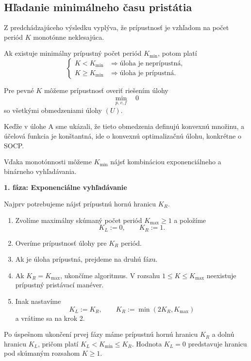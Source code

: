 \documentclass[12pt,a4paper]{article}
\begin{document}
\subsection*{Hľadanie minimálneho času pristátia}

Z predchádzajúceho výsledku vyplýva, že
prípustnosť je vzhľadom na počet periód $K$
monotónne neklesajúca.

Ak existuje minimálny prípustný počet periód
$K_{\min}$, potom platí
\[
\begin{cases}
K<K_{\min}
&\Rightarrow \text{úloha je neprípustná},\\
K\ge K_{\min}
&\Rightarrow \text{úloha je prípustná}.
\end{cases}
\]

Pre pevné $K$ môžeme prípustnosť overiť riešením úlohy
\[
\min_{p,v,f}\quad 0
\]
so všetkými obmedzeniami úlohy $(U)$.

Keďže v úlohe A sme ukázali, že tieto obmedzenia
definujú konvexnú množinu, a účelová funkcia
je konštantná, ide o konvexnú optimalizačnú úlohu,
konkrétne o SOCP.

Vďaka monotónnosti môžeme $K_{\min}$ nájsť
kombináciou exponenciálneho a binárneho vyhľadávania.

\textbf{1. fáza: Exponenciálne vyhľadávanie}

Najprv potrebujeme nájsť prípustnú hornú hranicu
$K_R$.

\begin{enumerate}[label=\arabic*.]
  \item Zvolíme maximálny skúmaný počet periód
  $K_{\max}\ge1$ a položíme
  \[
  K_L:=0,\qquad K_R:=1.
  \]

  \item Overíme prípustnosť úlohy pre $K_R$ periód.

  \item Ak je úloha prípustná, prejdeme
  na druhú fázu.

  \item Ak $K_R=K_{\max}$, ukončíme algoritmus.
  V rozsahu $1\le K\le K_{\max}$ neexistuje
  prípustný pristávací manéver.

  \item Inak nastavíme
  \[
  K_L:=K_R,\qquad
  K_R:=\min(2K_R,K_{\max})
  \]
  a vrátime sa na krok 2.
\end{enumerate}

Po úspešnom ukončení prvej fázy máme prípustnú
hornú hranicu $K_R$ a dolnú hranicu $K_L$,
pričom platí $K_L<K_{\min}\le K_R$.
Hodnota $K_L=0$ predstavuje hranicu pod
skúmaným rozsahom $K\ge1$.
\end{document}
